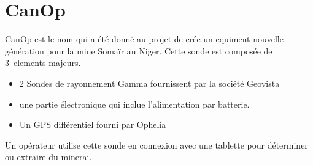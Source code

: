 \section{CanOp}
\label{sec_CanOp}
CanOp est le nom qui a été donné au projet de crée un equiment nouvelle génération pour la mine Somaïr au Niger. Cette sonde est composée de 3~elements majeurs.
\begin{itemize}
    \item 2 Sondes de rayonnement Gamma fournissent par la société Geovista
    \item une partie électronique qui inclue l'alimentation par batterie. %
    \item Un GPS différentiel fourni par Ophelia
\end{itemize}
Un opérateur utilise cette sonde en connexion avec une tablette pour déterminer ou extraire du minerai.%

